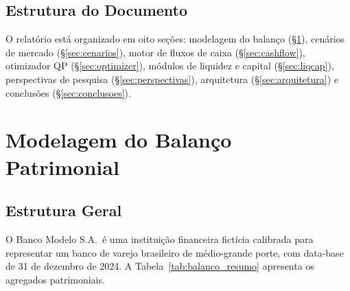 \documentclass[12pt, a4paper, oneside]{article}
\begin{document}
\subsection{Estrutura do Documento}

O relatório está organizado em oito seções: modelagem do balanço
(\S\ref{sec:balanco}), cenários de mercado (\S\ref{sec:cenarios}), motor de
fluxos de caixa (\S\ref{sec:cashflow}), otimizador QP (\S\ref{sec:optimizer}),
módulos de liquidez e capital (\S\ref{sec:liqcap}), perspectivas de pesquisa
(\S\ref{sec:perspectivas}), arquitetura (\S\ref{sec:arquitetura}) e conclusões
(\S\ref{sec:conclusoes}).

\section{Modelagem do Balanço Patrimonial}
\label{sec:balanco}

\subsection{Estrutura Geral}

O Banco Modelo S.A.\ é uma instituição financeira fictícia calibrada para
representar um banco de varejo brasileiro de médio-grande porte, com
data-base de 31 de dezembro de 2024.
A Tabela~\ref{tab:balanco_resumo} apresenta os agregados patrimoniais.
\end{document}

